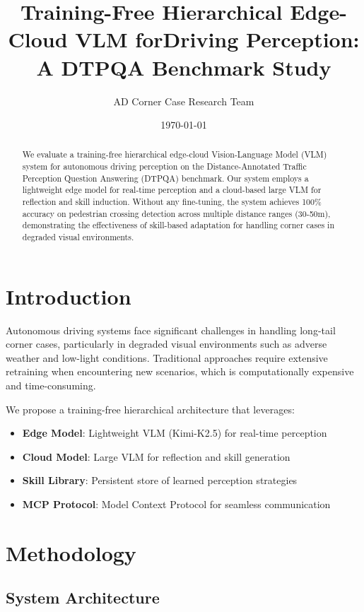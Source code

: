\documentclass[11pt,a4paper]{article}
\title{Training-Free Hierarchical Edge-Cloud VLM for\Autonomous Driving Perception: A DTPQA Benchmark Study}
\author{AD Corner Case Research Team}
\date{\today}
\begin{document}
\maketitle

\begin{abstract}
We evaluate a training-free hierarchical edge-cloud Vision-Language Model (VLM) system for autonomous driving perception on the Distance-Annotated Traffic Perception Question Answering (DTPQA) benchmark. Our system employs a lightweight edge model for real-time perception and a cloud-based large VLM for reflection and skill induction. Without any fine-tuning, the system achieves 100\% accuracy on pedestrian crossing detection across multiple distance ranges (30-50m), demonstrating the effectiveness of skill-based adaptation for handling corner cases in degraded visual environments.
\end{abstract}

\section{Introduction}

Autonomous driving systems face significant challenges in handling long-tail corner cases, particularly in degraded visual environments such as adverse weather and low-light conditions. Traditional approaches require extensive retraining when encountering new scenarios, which is computationally expensive and time-consuming.

We propose a training-free hierarchical architecture that leverages:
\begin{itemize}
    \item \textbf{Edge Model}: Lightweight VLM (Kimi-K2.5) for real-time perception
    \item \textbf{Cloud Model}: Large VLM for reflection and skill generation
    \item \textbf{Skill Library}: Persistent store of learned perception strategies
    \item \textbf{MCP Protocol}: Model Context Protocol for seamless communication
\end{itemize}

\section{Methodology}

\subsection{System Architecture}
\end{document}
